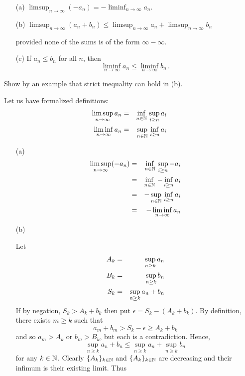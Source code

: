 \begin{enumerate}
\begin{excopy}
\begin{itemize}

\item[(a)] \qquad
   \(\displaystyle
      \limsup_{n\to \infty} (-a_n) =
     -\liminf_{n\to \infty} a_n
   \).

\item[(b)] \qquad
   \(\displaystyle
      \limsup_{n\to \infty} (a_n + b_n) \leq
      \limsup_{n\to \infty} a_n +
      \limsup_{n\to \infty} b_n\)

 provided none of the sums is of the form \(\infty - \infty\).

\item[(c)] If \(a_n\leq b_n\) for all $n$, then
 \[\liminf_{n\to\infty} a_n \leq \liminf_{n\to\infty} b_n\,.\]
\end{itemize}
Show by an example that strict inequality can hold in (b).
\end{excopy}

Let us have formalized definitions:
\begin{eqnarray*}
 \limsup_{n\to \infty} a_n  &=& \inf_{n\in\mathbb{N}}\, \sup_{i\geq n} a_i \\
 \liminf_{n\to \infty} a_n  &=& \sup_{n\in\mathbb{N}}\, \inf_{i\geq n} a_i
\end{eqnarray*}

\begin{itemize}
 \item[(a)]
  \begin{eqnarray*}
    \limsup_{n\to \infty} (-a_n)
     &=& \inf_{n\in\mathbb{N}}\, \sup_{i\geq n} -a_i \\
     &=& \inf_{n\in\mathbb{N}}\, -\inf_{i\geq n} a_i \\
     &=& -\sup_{n\in\mathbb{N}}\, \inf_{i\geq n} a_i \\
     &=& -\liminf_{n\to \infty} a_n
  \end{eqnarray*}

 \item[(b)]

 Let
 \begin{eqnarray}
  A_k &=& \sup_{n\geq k} a_n       \label{eq:Ak:limsup} \\
  B_k &=& \sup_{n\geq k} b_n       \label{eq:Bk:limsup} \\
  S_k &=& \sup_{n\geq k} a_n+b_n   \notag \\
 \end{eqnarray}
 If by negation, \(S_k > A_k + b_k\) then put
 \(\epsilon = S_k - (A_k+b_k)\).
 By definition, there exists \(m\geq k\) such that
 \begin{equation*}
 a_m+b_m > S_k - \epsilon \geq A_k + b_k
 \end{equation*}
 and so \(a_m > A_k\) or \(b_m > B_k\), but each is a contradiction.
 Hence,
 \begin{equation*}
  \sup_{n\geq k} a_n+b_n \leq \sup_{n\geq k} a_n + \sup_{n\geq k} b_n
 \end{equation*}
 for any \(k\in\mathbb{N}\).
 Clearly  \(\{A_k\}_{k\in\mathbb{N}}\) and \(\{A_k\}_{k\in\mathbb{N}}\)
 are decreasing and their infimum is their existing limit. Thus


\end{itemize}
\end{enumerate}
